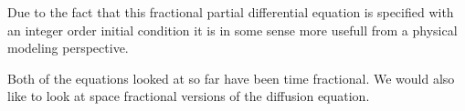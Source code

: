 Due to the fact that this fractional partial differential equation is specified with an integer order initial condition it is in some sense more usefull from a physical modeling perspective. 

Both of the equations looked at so far have been time fractional. We would also like to look at space fractional versions of the diffusion equation. 
\clearpage
